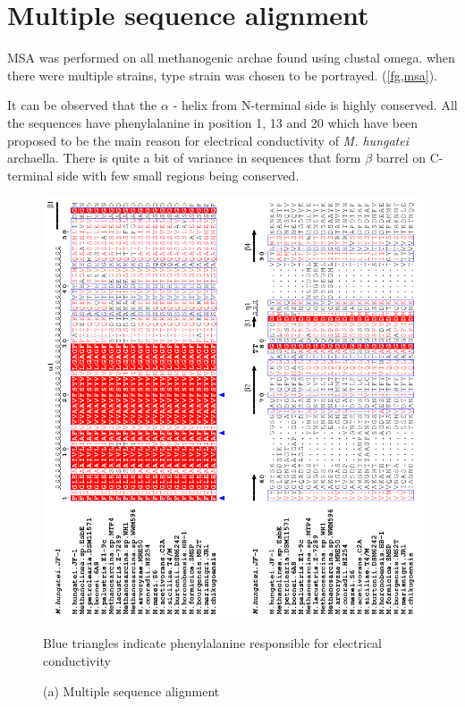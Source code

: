 \documentclass[fontsize=12pt,headsepline=true, bibliography=totocnumbered, twoside]{scrbook} %
\begin{document}
\section{Multiple sequence alignment}
\ac{MSA} was performed on all methanogenic archae found using clustal omega. when there were multiple strains, type strain was chosen to be portrayed. (\autoref{fg,msa}).

It can be observed that the $\alpha$ - helix from N-terminal side is highly conserved. All the sequences have phenylalanine in position 1, 13 and 20 which have been proposed to be the main reason for electrical conductivity of \textit{M. hungatei} archaella. There is quite a bit of variance in sequences that form $\beta$ barrel on C-terminal side with few small regions being conserved.


\begin{figure}
\raggedright
\includegraphics[scale=1.13]{alignment1}
\caption[Multiple sequence alignment (a)]{(a) Multiple sequence alignment}
Blue triangles indicate phenylalanine responsible for electrical conductivity 
\label{fg,msa}
\end{figure}
\end{document}
